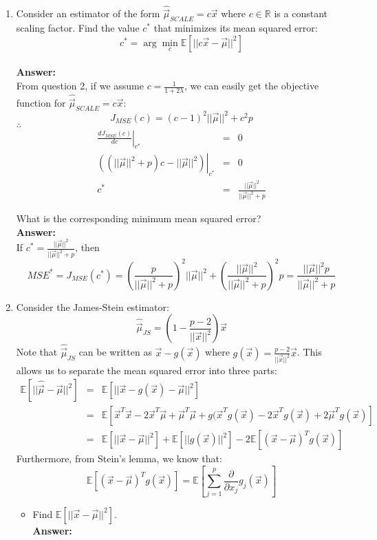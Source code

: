 \documentclass{article}
\begin{document}
\begin{enumerate}
	\item Consider an estimator of the form $\hat{\vec{\mu}}_{SCALE} = c\vec{x}$ where $c\in \mathbb{R}$ is a constant scaling factor. Find the value $c^*$ that minimizes its mean squared error:
	$$c^* = \arg\min_c{\mathbb{E}[||c\vec{x}-\vec{\mu}||^2]}$$
	\\\textbf{Answer:}\\
	From question 2, if we assume $c=\frac{1}{1+2\lambda}$, we can easily get the objective function for $\hat{\vec{\mu}}_{SCALE} = c\vec{x}$:
	$$J_{MSE}(c)=(c-1)^2||\vec{\mu}||^2+c^2p$$
	$\therefore$
	\begin{equation}
	\nonumber
	\begin{array}{rcl}
	\left.\frac{dJ_{MSE}(c)}{dc}\right|_{c^*} & = & 0 \\
	\left.((||\vec{\mu}||^2+p)c-||\vec{\mu}||^2)\right|_{c^*} & = & 0 \\
	c^* & = & \frac{||\vec{\mu}||^2}{||\vec{\mu}||^2+p}
	\end{array}
	\end{equation}
	
	What is the corresponding minimum mean squared error?
	\\\textbf{Answer:}\\
	If $c^* = \frac{||\vec{\mu}||^2}{||\vec{\mu}||^2+p}$, then 
	$$MSE^*=J_{MSE}(c^*)=(\frac{p}{||\vec{\mu}||^2+p})^2||\vec{\mu}||^2+(\frac{||\vec{\mu}||^2}{||\vec{\mu}||^2+p})^2p=\frac{||\vec{\mu}||^2p}{||\vec{\mu}||^2+p}$$
	
	\item Consider the James-Stein estimator:
	$$\hat{\vec{\mu}}_{JS}=\left(1-\frac{p-2}{||\vec{x}||^2}\right)\vec{x}$$
	Note that $\hat{\vec{\mu}}_{JS}$ can be written as $\vec{x}-g(\vec{x})$ where $g(\vec{x})=\frac{p-2}{||\vec{x}||^2}\vec{x}$. This allows us to separate the mean squared error into three parts:
	\begin{equation}
	\nonumber
	\begin{array}{rcl}
	\mathbb{E}[||\hat{\vec{\mu}}-\vec{\mu}||^2] & = & \mathbb{E}[||\vec{x}-g(\vec{x})-\vec{\mu}||^2] \\
												& = & \mathbb{E}[\vec{x}^T\vec{x}-2\vec{x}^T\vec{\mu}+\vec{\mu}^T\vec{\mu}+g(\vec{x}^Tg(\vec{x})-2\vec{x}^Tg(\vec{x})+2\vec{\mu}^Tg(\vec{x})] \\
												& = & \mathbb{E}[||\vec{x}-\vec{\mu}||^2]+\mathbb{E}[||g(\vec{x})||^2]-2\mathbb{E}[(\vec{x}-\vec{\mu})^Tg(\vec{x})]
	\end{array}
	\end{equation}
	Furthermore, from Stein's lemma, we know that: 
	$$\mathbb{E}[(\vec{x}-\vec{\mu})^Tg(\vec{x})] = \mathbb{E}\left[\sum_{j=1}^{p}{\frac{\partial}{\partial x_j}g_j(\vec{x})}\right]$$
	\begin{itemize}
		\item Find $\mathbb{E}[||\vec{x}-\vec{\mu}||^2]$.
		\\\textbf{Answer:}
		

\end{itemize}
\end{enumerate}
\end{document}
